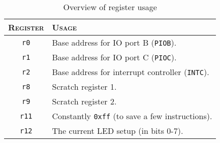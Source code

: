 \begin{table}
\centering
\begin{tabular}{ c | l }
    \hline \hline
    \textsc{Register} & \textsc{Usage} \\ \hline
    \texttt{r0} &       Base address for IO port B (\texttt{PIOB}). \\
    \texttt{r1} &       Base address for IO port C (\texttt{PIOC}). \\
    \texttt{r2} &       Base address for interrupt controller
                        (\texttt{INTC}). \\
    \texttt{r8} &       Scratch register 1. \\
    \texttt{r9} &       Scratch register 2. \\
    \texttt{r11} &      Constantly \texttt{0xff} (to save a few
                        instructions). \\
    \texttt{r12} &      The current LED setup (in bits 0-7). \\
    \hline
\end{tabular}
\caption{Overview of register usage}
\label{tab:registers}
\end{table}
